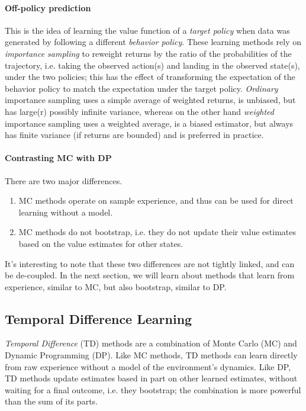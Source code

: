 \documentclass[12pt]{article}
\begin{document}
\paragraph{Off-policy prediction} This is the idea of learning the value function of a \emph{target policy} when data was generated by following a different \emph{behavior policy}. These learning methods rely on \emph{importance sampling} to reweight returns by the ratio of the probabilities of the trajectory, i.e. taking the observed action(s) and landing in the observed state(s), under the two policies; this has the effect of transforming the expectation of the behavior policy to match the expectation under the target policy. \emph{Ordinary} importance sampling uses a simple average of weighted returns, is unbiased, but has large(r) possibly infinite variance, whereas on the other hand \emph{weighted} importance sampling uses a weighted average, is a biased estimator, but always has finite variance (if returns are bounded) and is preferred in practice.

\paragraph{Contrasting MC with DP} There are two major differences.
\begin{enumerate}
  \item MC methods operate on sample experience, and thus can be used for direct     learning without a model.
\item MC methods do not bootstrap, i.e. they do not update their value estimates based on the value estimates for other states.
\end{enumerate}
It's interesting to note that these two differences are not tightly linked, and can be de-coupled. In the next section, we will learn about methods that learn from experience, similar to MC, but also bootstrap, similar to DP.

\subsection{Temporal Difference Learning}
\emph{Temporal Difference} (TD) methods are a combination of Monte Carlo (MC) and Dynamic Programming (DP). Like MC methods, TD methods can learn directly from raw experience without a model of the environment's dynamics. Like DP, TD methods update estimates based in part on other learned estimates, without waiting for a final outcome, i.e. they bootstrap; the combination is more powerful than the sum of its parts.
\end{document}
